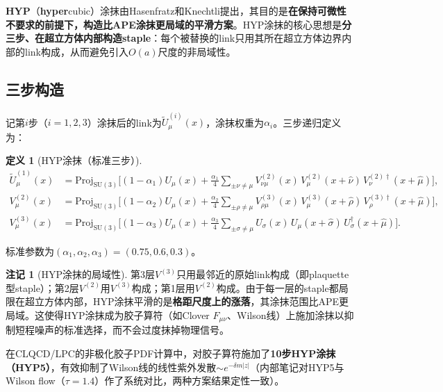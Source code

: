 \documentclass[12pt,a4paper]{ctexart}
\theoremstyle{definition}
\newtheorem{definition}{定义}[section]
\newtheorem{remark}{注记}[section]
\begin{document}
\textbf{HYP}（\textbf{hyper}cubic）涂抹由Hasenfratz和Knechtli提出\cite{HYP2001}，其目的是\textbf{在保持可微性不要求的前提下，构造比APE涂抹更局域的平滑方案}。HYP涂抹的核心思想是\textbf{分三步、在超立方体内部构造staple}：每个被替换的link只用其所在超立方体边界内部的link构成，从而避免引入$O(a)$尺度的非局域性。

\subsection{三步构造}

记第$i$步（$i=1,2,3$）涂抹后的link为$\tilde U^{(i)}_\mu(x)$，涂抹权重为$\alpha_i$。三步递归定义为\cite{HYP2001,Morningstar2004}：

\begin{definition}[HYP涂抹（标准三步）]
\begin{align}
\tilde U^{(1)}_\mu(x) &= \mathrm{Proj}_{\mathrm{SU}(3)}\!\Big[ (1-\alpha_1) U_\mu(x) + \frac{\alpha_1}{4}\sum_{\pm\nu \ne \mu} V^{(2)}_{\nu\mu}(x)\, V^{(2)}_\mu(x+\hat\nu)\, V^{(2)\dagger}_{\nu}(x+\hat\mu) \Big], \label{eq:hyp1} \\
V^{(2)}_\mu(x) &= \mathrm{Proj}_{\mathrm{SU}(3)}\!\Big[ (1-\alpha_2) U_\mu(x) + \frac{\alpha_2}{4}\sum_{\pm\rho \ne \mu} V^{(3)}_{\rho\mu}(x)\, V^{(3)}_\mu(x+\hat\rho)\, V^{(3)\dagger}_{\rho}(x+\hat\mu) \Big], \label{eq:hyp2} \\
V^{(3)}_\mu(x) &= \mathrm{Proj}_{\mathrm{SU}(3)}\!\Big[ (1-\alpha_3) U_\mu(x) + \frac{\alpha_3}{4}\sum_{\pm\sigma \ne \mu} U_\sigma(x)\, U_\mu(x+\hat\sigma)\, U^\dagger_\sigma(x+\hat\mu) \Big]. \label{eq:hyp3}
\end{align}
\end{definition}

标准参数为$(\alpha_1, \alpha_2, \alpha_3) = (0.75, 0.6, 0.3)$\cite{HYP2001}。

\begin{remark}[HYP涂抹的局域性]
\label{rem:hyp_locality}
第3层$V^{(3)}$只用最邻近的原始link构成（即plaquette型staple）；第2层$V^{(2)}$用$V^{(3)}$构成；第1层用$V^{(2)}$构成。由于每一层的staple都局限在超立方体内部，HYP涂抹平滑的是\textbf{格距尺度上的涨落}，其涂抹范围比APE更局域。这使得HYP涂抹成为胶子算符（如Clover $F_{\mu\nu}$、Wilson线）上施加涂抹以抑制短程噪声的标准选择，而不会过度抹掉物理信号\cite{Chen2025gluon}。
\end{remark}

在CLQCD/LPC的非极化胶子PDF计算中，对胶子算符施加了\textbf{10步HYP涂抹（HYP5）}\cite{Chen2025gluon}，有效抑制了Wilson线的线性紫外发散$\sim e^{-\delta m |z|}$（内部笔记\cite{NoteGluonPDFs}对HYP5与Wilson flow（$\tau=1.4$）作了系统对比，两种方案结果定性一致）。
\end{document}

